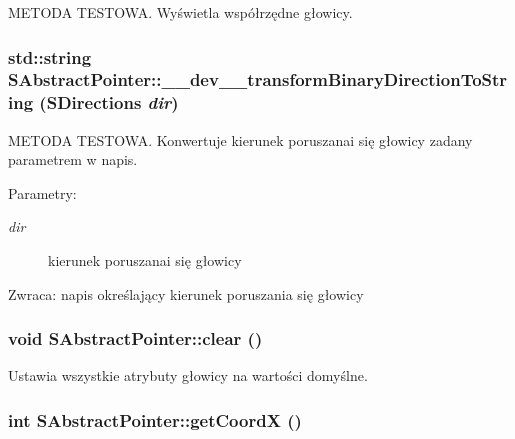 METODA TESTOWA. Wyświetla współrzędne głowicy. \hypertarget{classSAbstractPointer_5d7349c25205be738561fa791a77a3b8}{
\subsubsection[{\_\-\_\-dev\_\-\_\-transformBinaryDirectionToString}]{\setlength{\rightskip}{0pt plus 5cm}std::string SAbstractPointer::\_\-\_\-dev\_\-\_\-transformBinaryDirectionToString ({\bf SDirections} {\em dir})}}
\label{classSAbstractPointer_5d7349c25205be738561fa791a77a3b8}


METODA TESTOWA. Konwertuje kierunek poruszanai się głowicy zadany parametrem w napis. \begin{Desc}
\item[Parametry:]
\begin{description}
\item[{\em dir}]kierunek poruszanai się głowicy \end{description}
\end{Desc}
\begin{Desc}
\item[Zwraca:]napis określający kierunek poruszania się głowicy \end{Desc}
\hypertarget{classSAbstractPointer_bb15625597bfe9f3927cdc360214bc55}{
\subsubsection[{clear}]{\setlength{\rightskip}{0pt plus 5cm}void SAbstractPointer::clear ()}}
\label{classSAbstractPointer_bb15625597bfe9f3927cdc360214bc55}


Ustawia wszystkie atrybuty głowicy na wartości domyślne. \hypertarget{classSAbstractPointer_0e44b215ff78c8315a4fc4dc12cd4049}{
\subsubsection[{getCoordX}]{\setlength{\rightskip}{0pt plus 5cm}int SAbstractPointer::getCoordX ()}}
\label{classSAbstractPointer_0e44b215ff78c8315a4fc4dc12cd4049}


